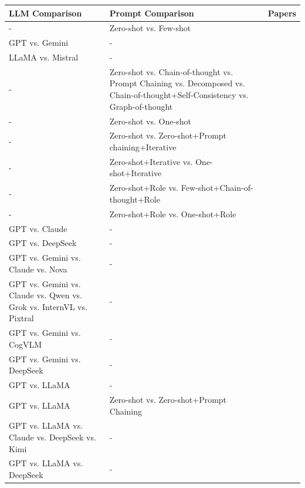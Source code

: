 \begin{tabular} { p{} p{} p{} } \\ 
\toprule 
LLM Comparison & Prompt Comparison & Papers\\ 
\midrule  
- & Zero-shot vs. Few-shot & \cite{ \paperonehundredfourteenth,\papertwohundredeleventh }\\ 
GPT vs. Gemini & - & \cite{ \paperonehundredfiftyninth,\paperonehundredsixtyeighth }\\ 
LLaMA vs. Mistral & - & \cite{ \paperonehundredfortieth,\paperonehundredfortyfirst }\\ 
- & Zero-shot vs. Chain-of-thought vs. Prompt Chaining vs. Decomposed vs. Chain-of-thought+Self-Consistency vs. Graph-of-thought & \cite{ \paperonehundredeightyfifth }\\ 
- & Zero-shot vs. One-shot & \cite{ \paperonehundredfortyeighth }\\ 
- & Zero-shot vs. Zero-shot+Prompt chaining+Iterative & \cite{ \papertwohundredthirtysixth }\\ 
- & Zero-shot+Iterative vs. One-shot+Iterative & \cite{ \paperonehundredfiftysecond }\\ 
- & Zero-shot+Role vs. Few-shot+Chain-of-thought+Role & \cite{ \paperonehundredfortyfifth }\\ 
- & Zero-shot+Role vs. One-shot+Role & \cite{ \paperonehundredseventyseventh }\\ 
GPT vs. Claude & - & \cite{ \papertwohundredfortyeighth }\\ 
GPT vs. DeepSeek & - & \cite{ \papertwohundredfiftieth }\\ 
GPT vs. Gemini vs. Claude vs. Nova & - & \cite{ \paperonehundredeightyseventh }\\ 
GPT vs. Gemini vs. Claude vs. Qwen vs. Grok vs. InternVL vs. Pixtral & - & \cite{ \papertwohundredtwentyeighth }\\ 
GPT vs. Gemini vs. CogVLM & - & \cite{ \paperninetyninth }\\ 
GPT vs. Gemini vs. DeepSeek & - & \cite{ \papertwohundredtwentyfirst }\\ 
GPT vs. LLaMA & - & \cite{ \paperfortyfirst }\\ 
GPT vs. LLaMA & Zero-shot vs. Zero-shot+Prompt Chaining & \cite{ \papertwentyfourth }\\ 
GPT vs. LLaMA vs. Claude vs. DeepSeek vs. Kimi & - & \cite{ \papertwohundredthird }\\ 
GPT vs. LLaMA vs. DeepSeek & - & \cite{ \papertwohundredfiftythird }\\ 

\end{tabular}
